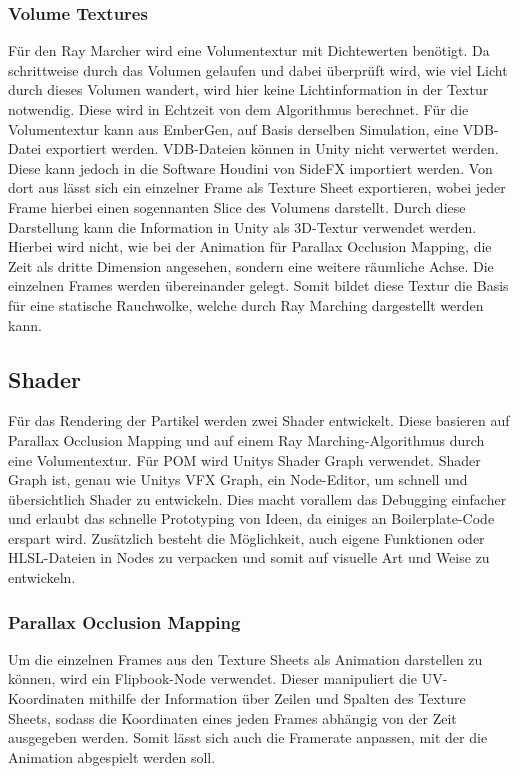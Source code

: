 \subsubsection{Volume Textures}
Für den Ray Marcher wird eine Volumentextur mit Dichtewerten benötigt. Da schrittweise durch das Volumen gelaufen und dabei überprüft wird, wie viel Licht
durch dieses Volumen wandert, wird hier keine Lichtinformation in der Textur notwendig. Diese wird in Echtzeit von dem Algorithmus berechnet.
Für die Volumentextur kann aus EmberGen, auf Basis derselben Simulation, eine VDB-Datei exportiert werden. VDB-Dateien können in Unity nicht verwertet werden. Diese kann jedoch in die Software Houdini von SideFX importiert werden. 
Von dort aus lässt sich ein einzelner Frame als Texture Sheet exportieren, wobei jeder Frame hierbei einen sogennanten Slice des Volumens darstellt.
Durch diese Darstellung kann die Information in Unity als 3D-Textur verwendet werden.
Hierbei wird nicht, wie bei der Animation für Parallax Occlusion Mapping, die Zeit als dritte Dimension angesehen, sondern eine weitere räumliche Achse.
Die einzelnen Frames werden übereinander gelegt. Somit bildet diese Textur die Basis für eine statische Rauchwolke, welche durch Ray Marching dargestellt werden kann.



\subsection{Shader}
Für das Rendering der Partikel werden zwei Shader entwickelt. Diese basieren auf Parallax Occlusion Mapping und auf einem Ray Marching-Algorithmus
durch eine Volumentextur. Für POM wird Unitys Shader Graph verwendet. Shader Graph ist, genau wie Unitys VFX Graph, ein Node-Editor, um
schnell und übersichtlich Shader zu entwickeln. Dies macht vorallem das Debugging einfacher und erlaubt das schnelle Prototyping von Ideen,
da einiges an Boilerplate-Code erspart wird. Zusätzlich besteht die Möglichkeit, auch eigene Funktionen oder HLSL-Dateien in Nodes
zu verpacken und somit auf visuelle Art und Weise zu entwickeln.


\subsubsection{Parallax Occlusion Mapping}

Um die einzelnen Frames aus den Texture Sheets als Animation darstellen zu können, wird ein
Flipbook-Node\parencite{UnityDocs}
verwendet. Dieser manipuliert die UV-Koordinaten mithilfe der Information über Zeilen und Spalten des Texture Sheets,
sodass die Koordinaten eines jeden Frames abhängig von der Zeit ausgegeben werden.
Somit lässt sich auch die Framerate anpassen, mit der die Animation abgespielt werden soll.

